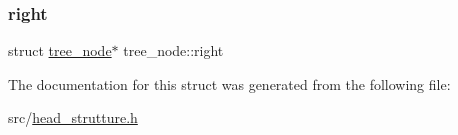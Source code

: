 \mbox{\label{structtree__node_a6d9a8d8aacc3caada9aed8e308c490a0}} 
\subsubsection{\texorpdfstring{right}{right}}
{\footnotesize\ttfamily struct \hyperlink{structtree__node}{tree\+\_\+node}$\ast$ tree\+\_\+node\+::right}



The documentation for this struct was generated from the following file\+:\begin{DoxyCompactItemize}
\item 
src/\hyperlink{head__strutture_8h}{head\+\_\+strutture.\+h}\end{DoxyCompactItemize}
